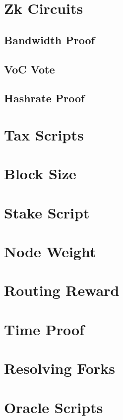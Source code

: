 \documentclass[a4paper,10pt]{article}
\begin{document}
\section{Zk Circuits}
\subsection{Bandwidth Proof}
\subsection{VoC Vote}
\subsection{Hashrate Proof}
\section{Tax Scripts}
\section{Block Size}
\section{Stake Script}
\section{Node Weight}
\section{Routing Reward}
\section{Time Proof}
\section{Resolving Forks}
\section{Oracle Scripts}
\end{document}
